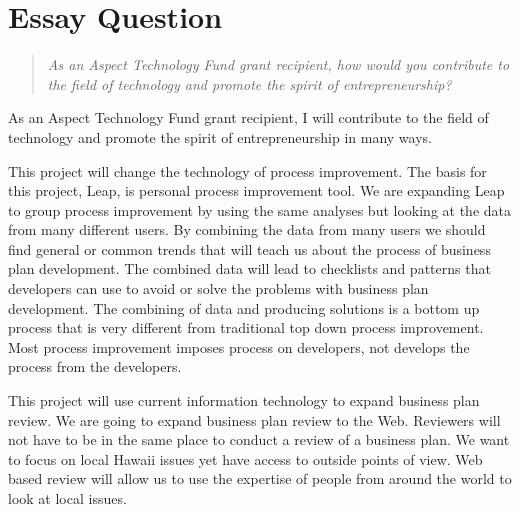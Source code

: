 
\section{Essay Question}

\begin{quote}
  {\em As an Aspect Technology Fund grant recipient, how would you contribute
    to the field of technology and promote the spirit of entrepreneurship?}
\end{quote}


As an Aspect Technology Fund grant recipient,  I will contribute to the
field of technology and promote the spirit of entrepreneurship in many
ways.  

This project will change the technology of process improvement.  The basis
for this project, Leap, is personal process improvement tool.  We are
expanding Leap to group process improvement by using the same analyses but
looking at the data from many different users.  By combining the data from
many users we should find general or common trends that will teach us about
the process of business plan development.  The combined data will lead to
checklists and patterns that developers can use to avoid or solve the
problems with business plan development.  The combining of data and
producing solutions is a bottom up process that is very different from
traditional top down process improvement.  Most process improvement imposes
process on developers, not develops the process from the developers.


This project will use current information technology to expand business
plan review.  We are going to expand business plan review to the Web.
Reviewers will not have to be in the same place to conduct a review of a
business plan.  We want to focus on local Hawaii issues yet have access to
outside points of view.  Web based review will allow us to use the
expertise of people from around the world to look at local issues.

